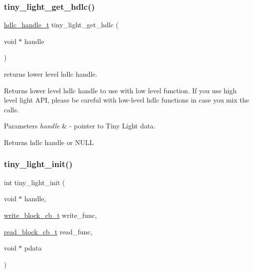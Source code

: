 \subsubsection{\texorpdfstring{tiny\+\_\+light\+\_\+get\+\_\+hdlc()}{tiny\_light\_get\_hdlc()}}
{\footnotesize\ttfamily \hyperlink{struct__hdlc__handle__t}{hdlc\+\_\+handle\+\_\+t} tiny\+\_\+light\+\_\+get\+\_\+hdlc (\begin{DoxyParamCaption}\item[{void $\ast$}]{handle }\end{DoxyParamCaption})}



returns lower level hdlc handle. 

Returns lower level hdlc handle to use with low level function. If you use high level light A\+PI, please be careful with low-\/level hdlc functions in case you mix the calls.


\begin{DoxyParams}{Parameters}
{\em handle} & -\/ pointer to Tiny Light data. \\
\hline
\end{DoxyParams}
\begin{DoxyReturn}{Returns}
hdlc handle or N\+U\+LL 
\end{DoxyReturn}
\mbox{\label{group__LIGHT__API_ga221cf790724163d1aee89ad6a6c9a14d}} 
\subsubsection{\texorpdfstring{tiny\+\_\+light\+\_\+init()}{tiny\_light\_init()}}
{\footnotesize\ttfamily int tiny\+\_\+light\+\_\+init (\begin{DoxyParamCaption}\item[{void $\ast$}]{handle,  }\item[{\hyperlink{tiny__types_8h_aafd634660bba76cace57a8f9b01e044d}{write\+\_\+block\+\_\+cb\+\_\+t}}]{write\+\_\+func,  }\item[{\hyperlink{tiny__types_8h_a15bec127d9ee63658563d62e92b5261b}{read\+\_\+block\+\_\+cb\+\_\+t}}]{read\+\_\+func,  }\item[{void $\ast$}]{pdata }\end{DoxyParamCaption})}


